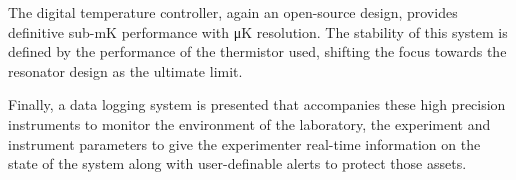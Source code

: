 {The digital temperature controller, again an open-source design, provides definitive sub-\unit{\milli\kelvin} performance with \unit{\micro\kelvin} resolution. The stability of this system is defined by the performance of the thermistor used, shifting the focus towards the resonator design as the ultimate limit.

Finally, a data logging system is presented that accompanies these high precision instruments to monitor the environment of the laboratory, the experiment and instrument parameters to give the experimenter real-time information on the state of the system along with user-definable alerts to protect those assets.
}
